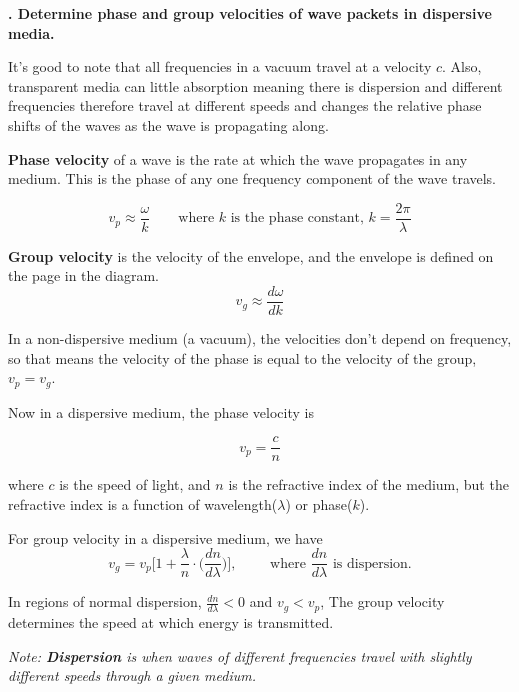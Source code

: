 \documentclass[10pt]{article}
\newcounter{counter}
\newcommand*{\question}[1]{
            \textbf{\thecounter. #1} \hfill
            \addtocounter{counter}{1}
            
            \newblock

            }
\begin{document}
\newpage

\question{Determine phase and group velocities of wave packets in dispersive media.}

It's good to note that all frequencies in a vacuum travel at a velocity $c$. Also, transparent media can little absorption meaning there is dispersion and different frequencies therefore travel at different speeds and changes the relative phase shifts of the waves as the wave is propagating along.

\newblock

\textbf{Phase velocity} of a wave is the rate at which the wave propagates in any medium. This is the phase of any one frequency component of the wave travels.

\[v_p \approx \frac{\omega}{k} \qquad \text{where $k$ is the phase constant, } k = \frac{2\pi}{\lambda}\]


\textbf{Group velocity} is the velocity of the envelope, and the envelope is defined on the page in the diagram.
\[v_g \approx \frac{d\omega}{dk}\]

In a non-dispersive medium (a vacuum), the velocities don't depend on frequency, so that means the velocity of the phase is equal to the velocity of the group, $v_p = v_g$.

\newblock

Now in a dispersive medium, the phase velocity is 

\[v_p = \frac{c}{n}\]

where $c$ is the speed of light, and $n$ is the refractive index of the medium, but the refractive index is a function of wavelength($\lambda$) or phase($k$).

For group velocity in a dispersive medium, we have
\[v_g = v_p\bigg[ 1 + \frac{\lambda}{n}\cdot \bigg(\frac{dn}{d\lambda}\bigg)\bigg], \qquad \text{ where $\frac{dn}{d\lambda}$ is dispersion.}\]

In regions of normal dispersion, $\frac{dn}{d\lambda} < 0$ and $v_g < v_p$, The group velocity determines the speed at which energy is transmitted.

\textit{Note: \textbf{Dispersion} is when waves of different frequencies travel with slightly different speeds through a given medium.}
\end{document}
